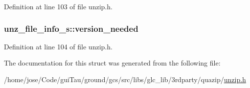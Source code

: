 Definition at line 103 of file unzip.\-h.

\hypertarget{structunz__file__info__s_a1578aca2bb7fed658f9f94c78d00288e}{
\subsubsection[{version\-\_\-needed}]{ unz\-\_\-file\-\_\-info\-\_\-s\-::version\-\_\-needed}}\label{structunz__file__info__s_a1578aca2bb7fed658f9f94c78d00288e}


Definition at line 104 of file unzip.\-h.



The documentation for this struct was generated from the following file\-:\begin{DoxyCompactItemize}
\item 
/home/jose/\-Code/gui\-Tau/ground/gcs/src/libs/glc\-\_\-lib/3rdparty/quazip/\hyperlink{unzip_8h}{unzip.\-h}\end{DoxyCompactItemize}
